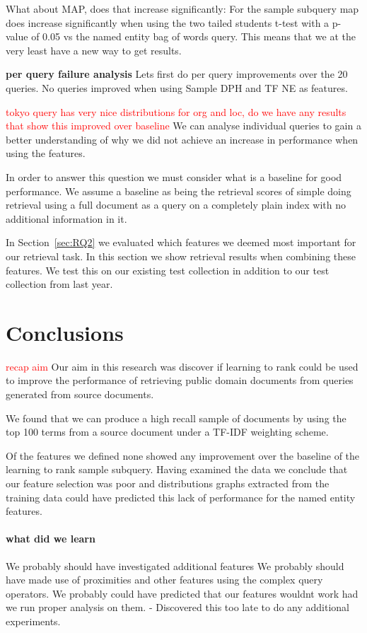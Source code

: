 \documentclass{mpaper}
\newcommand{\remove}[1]{\textcolor{red}{#1}}
\begin{document}
What about MAP, does that increase significantly:
For the sample subquery map does increase significantly when using the two tailed students t-test with a p-value of 0.05 vs the named entity bag of words query.
This means that we at the very least have a new way to get results.

\textbf{per query failure analysis}
Lets first do per query improvements over the 20 queries.
No queries improved when using Sample DPH and TF NE as features.


\remove{tokyo query has very nice distributions for org and loc, do we have any results that show this improved over baseline}
We can analyse individual queries to gain a better understanding of why we did not achieve an increase in performance when using the features.

In order to answer this question we must consider what is a baseline for good performance. We assume a baseline as being the retrieval scores of simple doing retrieval using a full document as a query on a completely plain index with no additional information in it.

In Section~\ref{sec:RQ2} we evaluated which features we deemed most important for our retrieval task. In this section we show retrieval results when combining these features.
We test this on our existing test collection in addition to our test collection from last year.

\section{Conclusions} \label{sec:conclusion}
\remove{recap aim}
Our aim in this research was discover if learning to rank could be used to improve the performance of retrieving public domain documents from queries generated from source documents.

We found that we can produce a high recall sample of documents by using the top 100 terms from a source document under a TF-IDF weighting scheme.

Of the features we defined none showed any improvement over the baseline of the learning to rank sample subquery. Having examined the data we conclude that our feature selection was poor and distributions graphs extracted from the training data could have predicted this lack of performance for the named entity features.

\paragraph{what did we learn}
We probably should have investigated additional features
We probably should have made use of proximities and other features using the complex query operators.
We probably could have predicted that our features wouldnt work had we run proper analysis on them. - Discovered this too late to do any additional experiments.
\end{document}
